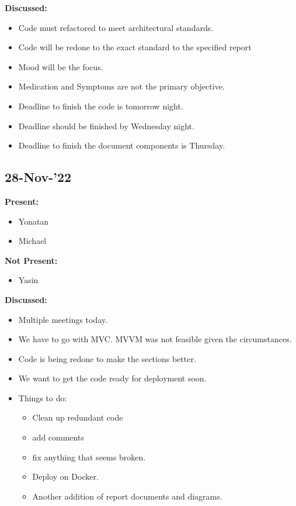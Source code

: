 \documentclass[11pt]{article}
\begin{document}
    \textbf{Discussed:}
    \begin{itemize}
        \item Code must refactored to meet architectural standards.
        \item Code will be redone to the exact standard to the specified report
        \item Mood will be the focus.
        \item Medication and Symptoms are not the primary objective.
        \item Deadline to finish the code is tomorrow night.
        \item Deadline should be finished by Wednesday night.
        \item Deadline to finish the document components is Thursday.
    \end{itemize}

    \subsection{28-Nov-’22}\label{subsec:28-nov-22}

    \textbf{Present:}
    \begin{itemize}
        \item Yonatan
        \item Michael
    \end{itemize}

    \textbf{Not Present:}

    \begin{itemize}
        \item Yasin
    \end{itemize}

    \textbf{Discussed:}
    \begin{itemize}
        \item Multiple meetings today.
        \item We have to go with MVC. MVVM was not feasible given the circumstances.
        \item Code is being redone to make the sections better.
        \item We want to get the code ready for deployment soon.
        \item Things to do:
        \begin{itemize}
            \item Clean up redundant code
            \item add comments
            \item fix anything that seems broken.
            \item Deploy on Docker.
            \item Another addition of report documents and diagrams.
        \end{itemize}
    \end{itemize}
\end{document}
